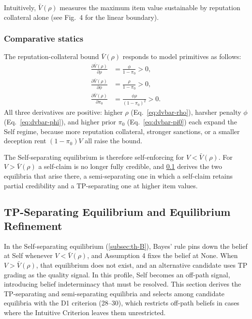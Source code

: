 \documentclass[11pt,letterpaper]{article}
\theoremstyle{definition}
\begin{document}
Intuitively, $\bar{V}(\rho)$ measures the maximum item value sustainable by reputation collateral alone (see Fig.~4 for the linear boundary).

\subsubsection*{Comparative statics}

The reputation-collateral bound $\bar{V}(\rho)$ responds to model primitives as follows:
\begin{align}
\frac{\partial \bar{V}(\rho)}{\partial \rho}   &= \frac{\phi}{1 - \pi_0} > 0, \label{eq:dvbar-rho}\\
\frac{\partial \bar{V}(\rho)}{\partial \phi}   &= \frac{\rho}{1 - \pi_0} > 0, \label{eq:dvbar-phi}\\
\frac{\partial \bar{V}(\rho)}{\partial \pi_0}  &= \frac{\phi\rho}{(1 - \pi_0)^2} > 0. \label{eq:dvbar-pi0}
\end{align}
All three derivatives are positive: higher $\rho$ (Eq.~\ref{eq:dvbar-rho}), harsher penalty $\phi$ (Eq.~\ref{eq:dvbar-phi}), and higher prior $\pi_0$ (Eq.~\ref{eq:dvbar-pi0}) each expand the Self regime, because more reputation collateral, stronger sanctions, or a smaller deception rent $(1-\pi_0)V$ all raise the bound.

The Self-separating equilibrium is therefore self-enforcing for $V < \bar{V}(\rho)$. For $V > \bar{V}(\rho)$ a self-claim is no longer fully credible, and \ref{subsec:th-C} derives the two equilibria that arise there, a semi-separating one in which a self-claim retains partial credibility and a TP-separating one at higher item values.

\subsection{TP-Separating Equilibrium and Equilibrium Refinement}\label{subsec:th-C}

In the Self-separating equilibrium (\ref{subsec:th-B}), Bayes' rule pins down the belief at Self whenever $V < \bar{V}(\rho)$, and Assumption 4 fixes the belief at None. When $V > \bar{V}(\rho)$, that equilibrium does not exist, and an alternative candidate uses TP grading as the quality signal. In this profile, Self becomes an off-path signal, introducing belief indeterminacy that must be resolved. This section derives the TP-separating and semi-separating equilibria and selects among candidate equilibria with the D1 criterion (28--30), which restricts off-path beliefs in cases where the Intuitive Criterion leaves them unrestricted.
\end{document}
